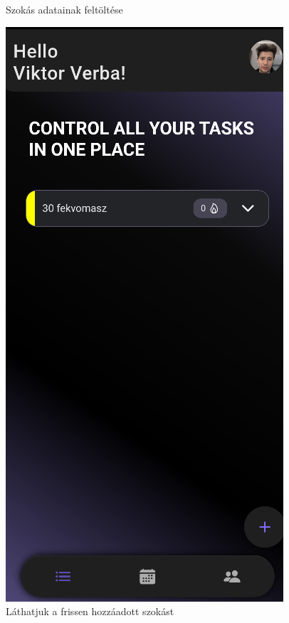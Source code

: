 \documentclass[12pt]{report}
\begin{document}
\begin{figure}[H]
\begin{minipage}[b]{0.25\textwidth}
       Szokás adatainak feltöltése
    \end{minipage}
    \hfill
    \begin{minipage}[b]{0.25\textwidth}
        \centering
        \includegraphics[width=\linewidth]{src/habit3.png}
        Láthatjuk a frissen hozzáadott szokást
    \end{minipage}


\end{figure}
\end{document}
